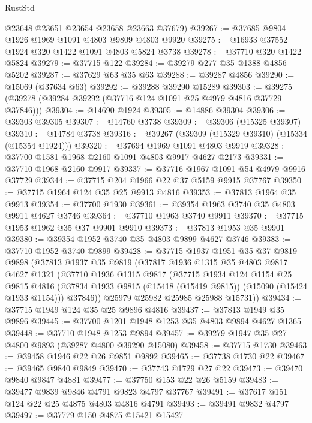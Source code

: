 \begin{lexlean}{RustStd}
\begin{coremodule}
      @23648
      @23651
      @23654
      @23658
      @23663
      @37679)
@39267 := @37685 @9804 @1926 @1969 @1091 @4803 @9809 @4803 @9920
@39275 := @16933 @37552 @1924 @320 @1422 @1091 @4803 @5824 @3738
@39278 := @37710 @320 @1422 @5824
@39279 := @37715 @122
@39284 := @39279 @277 @35 @1388 @4856 @5202
@39287 := @37629 @63 @35 @63
@39288 := @39287 @4856
@39290 := @15069 (@37634 @63)
@39292 := @39288 @39290 @15289
@39303 := @39275 (@39278 (@39284 @39292 (@37716 @124 @1091 @25 @4979 @4816 @37729 @37846)))
@39304 := @14690 @1924
@39305 := @14886 @39304
@39306 := @39303 @39305
@39307 := @14760 @3738
@39309 := @39306 (@15325 @39307)
@39310 := @14784 @3738
@39316 := @39267 (@39309 (@15329 @39310) (@15334 (@15354 @1924)))
@39320 := @37694 @1969 @1091 @4803 @9919
@39328 := @37700 @1581 @1968 @2160 @1091 @4803 @9917 @4627 @2173
@39331 := @37710 @1968 @2160 @9917
@39337 := @37716 @1967 @1091 @54 @4979 @9916 @37729
@39344 := @37715 @204 @1966 @22 @37 @5159 @9915 @37767
@39350 := @37715 @1964 @124 @35 @25 @9913 @4816
@39353 := @37813 @1964 @35 @9913
@39354 := @37700 @1930
@39361 := @39354 @1963 @3740 @35 @4803 @9911 @4627 @3746
@39364 := @37710 @1963 @3740 @9911
@39370 := @37715 @1953 @1962 @35 @37 @9901 @9910
@39373 := @37813 @1953 @35 @9901
@39380 := @39354 @1952 @3740 @35 @4803 @9899 @4627 @3746
@39383 := @37710 @1952 @3740 @9899
@39428 := @37715
    @1937
    @1951
    @35
    @37
    @9819
    @9898
    (@37813
      @1937
      @35
      @9819
      (@37817
        @1936
        @1315
        @35
        @4803
        @9817
        @4627
        @1321
        (@37710
          @1936
          @1315
          @9817
          (@37715
            @1934
            @124
            @1154
            @25
            @9815
            @4816
            (@37834 @1933 @9815 (@15418 (@15419 @9815)) (@15090 (@15424 @1933 @1154)))
            @37846))
        @25979
        @25982
        @25985
        @25988
        @15731))
@39434 := @37715 @1949 @124 @35 @25 @9896 @4816
@39437 := @37813 @1949 @35 @9896
@39445 := @37700 @1201 @1948 @1253 @35 @4803 @9894 @4627 @1365
@39448 := @37710 @1948 @1253 @9894
@39457 := @39279 @1947 @35 @27 @4800 @9893 (@39287 @4800 @39290 @15080)
@39458 := @37715 @1730
@39463 := @39458 @1946 @22 @26 @9851 @9892
@39465 := @37738 @1730 @22
@39467 := @39465 @9840 @9849
@39470 := @37743 @1729 @27 @22
@39473 := @39470 @9840 @9847 @4881
@39477 := @37750 @153 @22 @26 @5159
@39483 := @39477 @9839 @9846 @4791 @9823 @4797 @37767
@39491 := @37617 @151 @124 @22 @25 @4875 @4803 @4816 @4791
@39493 := @39491 @9832 @4797
@39497 := @37779 @150 @4875 @15421 @15427

\end{coremodule}
\end{lexlean}
